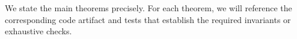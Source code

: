 We state the main theorems precisely. For each theorem, we will reference the corresponding code artifact and tests that establish the required invariants or exhaustive checks.

